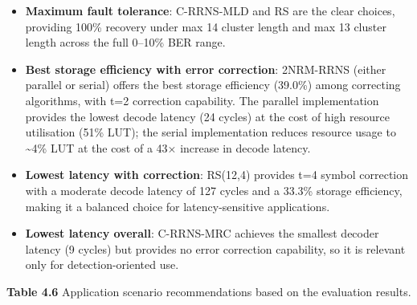 \documentclass[
  english,
  12pt,
]{report}
\begin{document}
\begin{itemize}
\item
  \textbf{Maximum fault tolerance}: C-RRNS-MLD and RS are the clear
  choices, providing 100\% recovery under max 14 cluster length and max
  13 cluster length across the full 0--10\% BER range.
\item
  \textbf{Best storage efficiency with error correction}: 2NRM-RRNS
  (either parallel or serial) offers the best storage efficiency
  (39.0\%) among correcting algorithms, with t=2 correction capability.
  The parallel implementation provides the lowest decode latency (24
  cycles) at the cost of high resource utilisation (51\% LUT); the
  serial implementation reduces resource usage to \textasciitilde4\% LUT
  at the cost of a 43× increase in decode latency.
\item
  \textbf{Lowest latency with correction}: RS(12,4) provides t=4 symbol
  correction with a moderate decode latency of 127 cycles and a 33.3\%
  storage efficiency, making it a balanced choice for latency-sensitive
  applications.
\item
  \textbf{Lowest latency overall}: C-RRNS-MRC achieves the smallest
  decoder latency (9 cycles) but provides no error correction
  capability, so it is relevant only for detection-oriented use.
\end{itemize}

\textbf{Table 4.6} Application scenario recommendations based on the
evaluation results.
\end{document}
